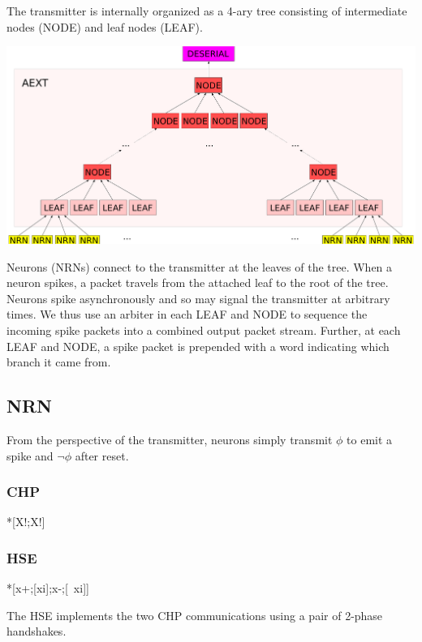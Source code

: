 \documentclass{article}
\begin{document}
The transmitter is internally organized as a 4-ary tree consisting of intermediate
nodes (NODE) and leaf nodes (LEAF).
\begin{center}
    \includegraphics[width=.7\textwidth]{img/aext.pdf}
\end{center}
Neurons (NRNs) connect to the transmitter at the leaves of the tree.
When a neuron spikes, a packet travels from the attached leaf to the root of 
the tree. Neurons spike asynchronously and so may signal the transmitter at 
arbitrary times. We thus use an arbiter in each LEAF and NODE to sequence the 
incoming spike packets into a combined output packet stream. Further, at each 
LEAF and NODE, a spike packet is prepended with a word indicating which 
branch it came from.

\subsection{NRN \label{sec:AEXT_NRN}}

From the perspective of the transmitter, neurons simply transmit $\phi$ to 
emit a spike and $\neg\phi$ after reset.

\subsubsection*{CHP}

\begin{csp}
*[X!\phi;X!\neg\phi]
\end{csp}

\subsubsection*{HSE}

\begin{hse}
*[x\phi+;[xi];x\phi-;[~xi]]
\end{hse}

\noindent
The HSE implements the two CHP communications using a pair of 2-phase handshakes.
\end{document}
